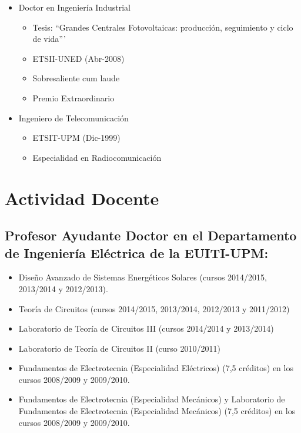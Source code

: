 \documentclass[article, a4paper]{memoir}
\begin{document}
\begin{itemize}
\item Doctor en Ingeniería Industrial
\begin{itemize}
\item Tesis: ``Grandes Centrales Fotovoltaicas: producción,
seguimiento y ciclo de vida'''
\item ETSII-UNED (Abr-2008)
\item Sobresaliente cum laude
\item Premio Extraordinario
\end{itemize}

\item Ingeniero de Telecomunicación
\begin{itemize}
\item ETSIT-UPM (Dic-1999)
\item Especialidad en Radiocomunicación
\end{itemize}
\end{itemize}


\section{Actividad Docente}
\label{sec-3}

\subsection{Profesor Ayudante Doctor en el Departamento de Ingeniería Eléctrica de la EUITI-UPM:}
\label{sec-3-1}

\begin{itemize}
\item Diseño Avanzado de Sistemas Energéticos Solares (cursos 2014/2015, 2013/2014 y 2012/2013).

\item Teoría de Circuitos (cursos 2014/2015, 2013/2014, 2012/2013 y 2011/2012)

\item Laboratorio de Teoría de Circuitos III (cursos 2014/2014 y 2013/2014)

\item Laboratorio de Teoría de Circuitos II (curso 2010/2011)

\item Fundamentos de Electrotecnia (Especialidad Eléctricos) (7,5 créditos) en los cursos 2008/2009 y 2009/2010.

\item Fundamentos de Electrotecnia (Especialidad Mecánicos) y Laboratorio de Fundamentos de Electrotecnia (Especialidad Mecánicos) (7,5 créditos) en los cursos 2008/2009 y 2009/2010.
\end{itemize}
\end{document}
